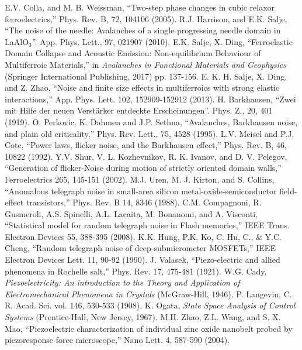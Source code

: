 \documentclass[12pt,column,showpacs,pre,preprintnumbers,amsmath,amssymb,aps,standalone]{revtex4-2}
\begin{document}
\begin{thebibliography}{10}
	 E.V. Colla, and M. B. Weissman, \enquote{Two-step phase changes in cubic relaxor ferroelectrics,} Phys. Rev. B, 72, 104106 (2005).
	 R.J. Harrison, and E.K. Salje, \enquote{The noise of the needle: Avalanches of a single progressing needle domain in LaAlO$_3$}. App. Phys. Lett., 97, 021907 (2010).
	 E.K. Salje, X. Ding, \enquote{Ferroelastic Domain Collapse and Acoustic Emission: Non-equilibrium Behaviour of Multiferroic Materials,} in \textit{Avalanches in Functional Materials and Geophysics} (Springer International Publishing, 2017) pp. 137-156.
	 E. K. H. Salje, X. Ding, and Z. Zhao, \enquote{Noise and finite size effects in multiferroics with strong elastic interactions,} App. Phys. Lett. 102, 152909-152912 (2013).
	H. Barkhausen, \enquote{Zwei mit Hilfe der neuen Verstärker entdeckte Erscheinungen}. Phys. Z., 20, 401 (1919).
	O. Perkovic, K. Dahmen and J.P. Sethna,  \enquote{Avalanches, Barkhausen noise, and plain old criticality,} Phys. Rev. Lett., 75, 4528 (1995).
	 L.V. Meisel and P.J. Cote, \enquote{Power laws, flicker noise, and the Barkhausen effect,} Phys. Rev. B, 46, 10822 (1992).
	Y.V. Shur, V. L. Kozhevnikov, R. K. Ivanov, and D. V. Pelegov, \enquote{Generation of flicker-Noise during motion of strictly oriented domain walls,} Ferroelectrics 265, 145-151 (2002).
 M.J.	Uren, M. J. Kirton, and S. Collins, \enquote{Anomalous telegraph noise in small-area silicon metal-oxide-semiconductor field-effect transistors,} Phys. Rev. B 14, 8346 (1988).
C.M. Compagnoni, R. Gusmeroli, A.S. Spinelli, A.L. Lacaita, M. Bonanomi, and A. Visconti, \enquote{Statistical model for random telegraph noise in Flash memories,} IEEE Trans. Electron Devices 55, 
 388-395 (2008).
 K.K. Hung, P.K. Ko, C. Hu, C., \& Y.C. Cheng, \enquote{Random telegraph noise of deep-submicrometer MOSFETs,} IEEE Electron Devices Lett. 11, 90-92 (1990).
 J. Valasek, \enquote {Piezo-electric and allied phenomena in Rochelle salt,} Phys. Rev. 17, 475-481 (1921).
	W.G. Cady, \textit{Piezoelectricity: An introduction to the Theory and Application of Electromechanical Phenomena in Crystals} (McGraw-Hill, 1946).
	 P. Langevin, C. R. Acad. Sci. vol. 146, 530-533 (1908).
	K. Ogata, \textit{State Space Analysis of Control Systems} (Prentice-Hall, New Jersey, 1967).
	M.H. Zhao, Z.L. Wang, and S. X. Mao, \enquote{Piezoelectric characterization of individual zinc oxide nanobelt probed by piezoresponse force microscope,} Nano Lett. 4, 587-590 (2004).

\end{thebibliography}
\end{document}
